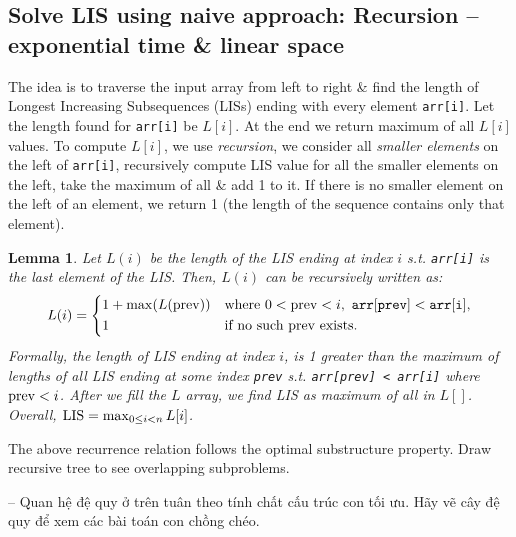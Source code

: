 \documentclass{article}
\newtheorem{lemma}{Lemma}
\begin{document}

\subsection{Solve LIS using naive approach: Recursion -- exponential time \& linear space}
The idea is to traverse the input array from left to right \& find the length of Longest Increasing Subsequences (LISs) ending with every element {\tt arr[i]}. Let the length found for {\tt arr[i]} be $L[i]$. At the end we return maximum of all $L[i]$ values. To compute $L[i]$, we use {\it recursion}, we consider all {\it smaller elements} on the left of {\tt arr[i]}, recursively compute LIS value for all the smaller elements on the left, take the maximum of all \& add 1 to it. If there is no smaller element on the left of an element, we return 1 (the length of the sequence contains only that element).

\begin{lemma}
    Let $L(i)$ be the length of the LIS ending at index $i$ s.t. {\tt arr[i]} is the last element of the LIS. Then, $L(i)$ can be recursively written as:
    \begin{equation*}
        L(i) = \left\{\begin{split}
            &1 + \max(L({\rm prev}))&&\mbox{where } 0 < {\rm prev} < i,\ {\tt arr[prev] < arr[i]},\\
            &1&&\mbox{if no such prev exists}.
        \end{split}\right.
    \end{equation*}
    Formally, the length of LIS ending at index $i$, is 1 greater than the maximum of lengths of all LIS ending at some index {\tt prev} s.t. {\tt arr[prev] < arr[i]} where ${\rm prev} < i$. After we fill the $L$ array, we find LIS as maximum of all in $L[]$. Overall, ${\rm LIS} = \max_{0\le i < n} L[i]$.
\end{lemma}
The above recurrence relation follows the optimal substructure property. Draw recursive tree to see overlapping subproblems.

-- Quan hệ đệ quy ở trên tuân theo tính chất cấu trúc con tối ưu. Hãy vẽ cây đệ quy để xem các bài toán con chồng chéo.
\end{document}
